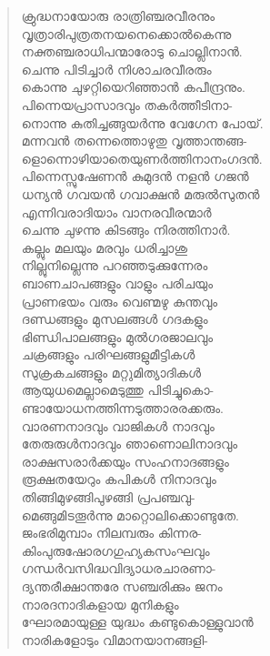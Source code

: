 \begin{verse}
ക്രുദ്ധനായോരു രാത്രിഞ്ചരവീരനും\\
വൃത്രാരിപുത്രതനയനെക്കൊല്‍കെന്നു\\
നക്തഞ്ചരാധിപന്മാരോടു ചൊല്ലിനാന്‍.\\
ചെന്നു പിടിച്ചാര്‍ നിശാചരവീരരും\\
കൊന്നു ചുഴറ്റിയെറിഞ്ഞാന്‍ കപീന്ദ്രനും.\\
പിന്നെയപ്രാസാദവും തകര്‍ത്തീടിനാ-\\
നൊന്നു കുതിച്ചങ്ങുയര്‍ന്നു വേഗേന പോയ്.\\
മന്നവന്‍ തന്നെത്തൊഴുതു വൃത്താന്തങ്ങ-\\
ളൊന്നൊഴിയാതെയുണര്‍ത്തിനാനംഗദന്‍.\\
പിന്നെസ്സുഷേണന്‍ കുമുദന്‍ നളന്‍ ഗജന്‍\\
ധന്യന്‍ ഗവയന്‍ ഗവാക്ഷന്‍ മരുല്‍സുതന്‍\\
എന്നിവരാദിയാം വാനരവീരന്മാര്‍\\
ചെന്നു ചുഴന്നു കിടങ്ങും നിരത്തിനാര്‍.\\
കല്ലും മലയും മരവും ധരിച്ചാശു\\
നില്ലുനില്ലെന്നു പറഞ്ഞടുക്കുന്നേരം\\
ബാണചാപങ്ങളും വാളും പരിചയും\\
പ്രാണഭയം വരും വെണ്മഴു കുന്തവും\\
ദണ്ഡങ്ങളും മുസലങ്ങള്‍ ഗദകളും\\
ഭിണ്ഡിപാലങ്ങളും മുല്‍ഗരജാലവും\\
ചക്രങ്ങളും പരിഘങ്ങളുമീട്ടികള്‍\\
സുക്രകചങ്ങളും മറ്റുമിത്യാദികള്‍\\
ആയുധമെല്ലാമെടുത്തു പിടിച്ചുകൊ-\\
ണ്ടായോധനത്തിന്നടുത്താരരക്കരും.\\
വാരണനാദവും വാജികള്‍ നാദവും\\
തേരുരുള്‍നാദവും ഞാണൊലിനാദവും\\
രാക്ഷസരാര്‍ക്കയും സംഹനാദങ്ങളും\\
രൂക്ഷതയേറും കപികള്‍ നിനാദവും\\
തിങ്ങിമുഴങ്ങിപുഴങ്ങി പ്രപഞ്ചവു-\\
മെങ്ങുമിടതൂര്‍ന്നു മാറ്റൊലിക്കൊണ്ടുതേ.\\
ജംഭരിമുമ്പാം നിലമ്പരും കിന്നര-\\
കിംപുരുഷോരഗഗുഹ്യകസംഘവും\\
ഗന്ധര്‍വസിദ്ധവിദ്യാധരചാരണാ-\\
ദ്യന്തരീക്ഷാന്തരേ സഞ്ചരിക്കും ജനം\\
നാരദനാദികളായ മുനികളും\\
ഘോരമായുള്ള യുദ്ധം കണ്ടുകൊള്ളുവാന്‍\\
നാരികളോടും വിമാനയാനങ്ങളി-\\

\end{verse}
